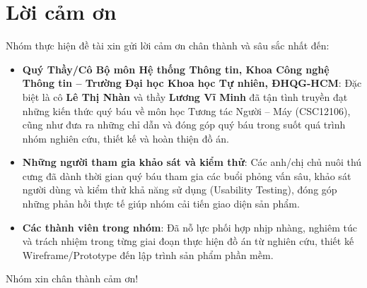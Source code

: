 \newpage
\section*{Lời cảm ơn}

Nhóm thực hiện đề tài xin gửi lời cảm ơn chân thành và sâu sắc nhất đến:
\begin{itemize}
    \item \textbf{Quý Thầy/Cô Bộ môn Hệ thống Thông tin, Khoa Công nghệ Thông tin -- Trường Đại học Khoa học Tự nhiên, ĐHQG-HCM}: Đặc biệt là cô \textbf{Lê Thị Nhàn} và thầy \textbf{Lương Vĩ Minh} đã tận tình truyền đạt những kiến thức quý báu về môn học Tương tác Người -- Máy (CSC12106), cũng như đưa ra những chỉ dẫn và đóng góp quý báu trong suốt quá trình nhóm nghiên cứu, thiết kế và hoàn thiện đồ án.
    \item \textbf{Những người tham gia khảo sát và kiểm thử}: Các anh/chị chủ nuôi thú cưng đã dành thời gian quý báu tham gia các buổi phỏng vấn sâu, khảo sát người dùng và kiểm thử khả năng sử dụng (Usability Testing), đóng góp những phản hồi thực tế giúp nhóm cải tiến giao diện sản phẩm.
    \item \textbf{Các thành viên trong nhóm}: Đã nỗ lực phối hợp nhịp nhàng, nghiêm túc và trách nhiệm trong từng giai đoạn thực hiện đồ án từ nghiên cứu, thiết kế Wireframe/Prototype đến lập trình sản phẩm phần mềm.
\end{itemize}

Nhóm xin chân thành cảm ơn!
